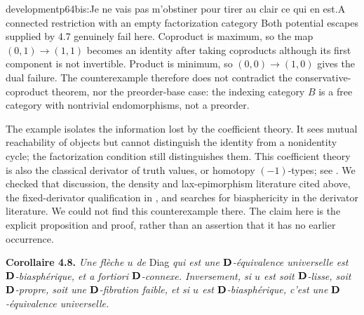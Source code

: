 \begin{dcomment}{development}{p64bis:Je ne vais pas m'obstiner pour tirer au clair ce qui en est.}{A connected restriction with an empty factorization category}
Both potential escapes supplied by 4.7 genuinely fail here. Coproduct is maximum, so the map $(0,1)\to(1,1)$ becomes an identity after taking coproducts although its first component is not invertible. Product is minimum, so $(0,0)\to(1,0)$ gives the dual failure. The counterexample therefore does not contradict the conservative-coproduct theorem, nor the preorder-base case: the indexing category $B$ is a free category with nontrivial endomorphisms, not a preorder.

The example isolates the information lost by the coefficient theory. It sees mutual reachability of objects but cannot distinguish the identity from a nonidentity cycle; the factorization condition still distinguishes them. This coefficient theory is also the classical derivator of truth values, or homotopy $(-1)$-types; see \citet[p.~33]{Shulman2023Setoids}. We checked that discussion, the density and lax-epimorphism literature cited above, the fixed-derivator qualification in \citet[Remark 6.3(ii)]{GrothStovicek2016Trees}, and searches for biasphericity in the derivator literature. We could not find this counterexample there. The claim here is the explicit proposition and proof, rather than an assertion that it has no earlier occurrence.
\end{dcomment}



\textbf{Corollaire 4.8.} \textit{Une flèche $u$ de} Diag \textit{qui est une $\mathbf{D}$-équivalence universelle est $\mathbf{D}$-biasphérique, et \textup{a fortiori} $\mathbf{D}$-connexe. Inversement, si $u$ est soit $\mathbf{D}$-lisse, soit $\mathbf{D}$-propre, soit une $\mathbf{D}$-fibration faible, et si $u$ est $\mathbf{D}$-biasphérique, c'est une $\mathbf{D}$-équivalence universelle.}

